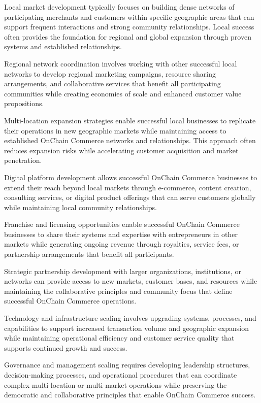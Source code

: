 \documentclass[
  Letterpaper,
]{scrbook}
\begin{document}
Local market development typically focuses on building dense networks of
participating merchants and customers within specific geographic areas
that can support frequent interactions and strong community
relationships. Local success often provides the foundation for regional
and global expansion through proven systems and established
relationships.

Regional network coordination involves working with other successful
local networks to develop regional marketing campaigns, resource sharing
arrangements, and collaborative services that benefit all participating
communities while creating economies of scale and enhanced customer
value propositions.

Multi-location expansion strategies enable successful local businesses
to replicate their operations in new geographic markets while
maintaining access to established OnChain Commerce networks and
relationships. This approach often reduces expansion risks while
accelerating customer acquisition and market penetration.

Digital platform development allows successful OnChain Commerce
businesses to extend their reach beyond local markets through
e-commerce, content creation, consulting services, or digital product
offerings that can serve customers globally while maintaining local
community relationships.

Franchise and licensing opportunities enable successful OnChain Commerce
businesses to share their systems and expertise with entrepreneurs in
other markets while generating ongoing revenue through royalties,
service fees, or partnership arrangements that benefit all participants.

Strategic partnership development with larger organizations,
institutions, or networks can provide access to new markets, customer
bases, and resources while maintaining the collaborative principles and
community focus that define successful OnChain Commerce operations.

Technology and infrastructure scaling involves upgrading systems,
processes, and capabilities to support increased transaction volume and
geographic expansion while maintaining operational efficiency and
customer service quality that supports continued growth and success.

Governance and management scaling requires developing leadership
structures, decision-making processes, and operational procedures that
can coordinate complex multi-location or multi-market operations while
preserving the democratic and collaborative principles that enable
OnChain Commerce success.
\end{document}
